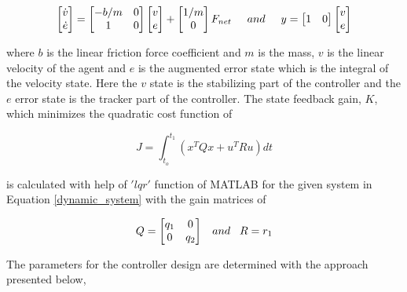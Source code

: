 \begin{equation} \label{dynamic_system}
\begin{bmatrix}
\dot{v} \\ \dot{e}
\end{bmatrix}
=
\begin{bmatrix}
-b/m & 0 \\
1 & 0
\end{bmatrix}
\begin{bmatrix}
v \\ e
\end{bmatrix}
+ \begin{bmatrix}
1/m \\ 0
\end{bmatrix}
F_{net} \hspace{0.5cm} and
\hspace{0.5cm}
y = \begin{bmatrix}
1 & 0
\end{bmatrix}
\begin{bmatrix}
v \\ e
\end{bmatrix}
\end{equation}

where $b$ is the linear friction force coefficient and $m$ is the mass, $v$  is the linear velocity of the agent and $e$ is the augmented error state which is the integral of the velocity state. Here the $v$ state is the stabilizing part of the controller and the $e$ error state is the tracker part of the controller. The state feedback gain, $K$, which minimizes the quadratic cost function of

\begin{equation}
J = \int_{t_o}^{t_1}(x^TQx + u^TRu) dt
\end{equation}

is calculated with help of $'lqr'$ function of MATLAB for the given system in Equation \ref{dynamic_system} with the gain matrices of 

\begin{equation}
Q = \begin{bmatrix}
q_1 & 0 \\ 0 & q_2
\end{bmatrix}
\hspace{0.3cm} and
\hspace{0.3cm}
R = r_1
\end{equation}

The parameters for the controller design are determined with the approach presented below,

